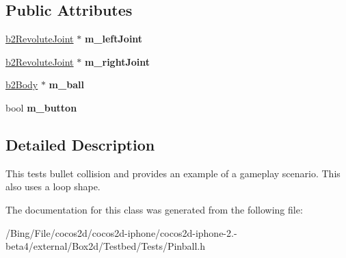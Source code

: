 \subsection*{Public Attributes}
\begin{DoxyCompactItemize}
\item 
\hypertarget{class_pinball_a616b2900d499035e4e2862355613b311}{\hyperlink{classb2_revolute_joint}{b2\-Revolute\-Joint} $\ast$ {\bfseries m\-\_\-left\-Joint}}\label{class_pinball_a616b2900d499035e4e2862355613b311}

\item 
\hypertarget{class_pinball_ae6fe2000958c4b3f781beb60c9c4da27}{\hyperlink{classb2_revolute_joint}{b2\-Revolute\-Joint} $\ast$ {\bfseries m\-\_\-right\-Joint}}\label{class_pinball_ae6fe2000958c4b3f781beb60c9c4da27}

\item 
\hypertarget{class_pinball_a398992316ade3d6a54dd5d9dba834608}{\hyperlink{classb2_body}{b2\-Body} $\ast$ {\bfseries m\-\_\-ball}}\label{class_pinball_a398992316ade3d6a54dd5d9dba834608}

\item 
\hypertarget{class_pinball_a40d4efa43f8449d044ebfad6a3b18bcc}{bool {\bfseries m\-\_\-button}}\label{class_pinball_a40d4efa43f8449d044ebfad6a3b18bcc}

\end{DoxyCompactItemize}


\subsection{Detailed Description}
This tests bullet collision and provides an example of a gameplay scenario. This also uses a loop shape. 

The documentation for this class was generated from the following file\-:\begin{DoxyCompactItemize}
\item 
/\-Bing/\-File/cocos2d/cocos2d-\/iphone/cocos2d-\/iphone-\/2.-\/beta4/external/\-Box2d/\-Testbed/\-Tests/Pinball.\-h\end{DoxyCompactItemize}
